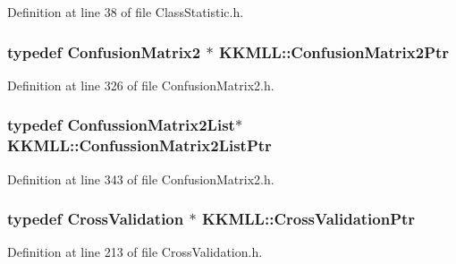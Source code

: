 Definition at line 38 of file Class\+Statistic.\+h.

\subsubsection[{\texorpdfstring{Confusion\+Matrix2\+Ptr}{ConfusionMatrix2Ptr}}]{\setlength{\rightskip}{0pt plus 5cm}typedef {\bf Confusion\+Matrix2} $\ast$ {\bf K\+K\+M\+L\+L\+::\+Confusion\+Matrix2\+Ptr}}\hypertarget{namespace_k_k_m_l_l_a724c9a3c5315800e128adf68253e91ae}{}\label{namespace_k_k_m_l_l_a724c9a3c5315800e128adf68253e91ae}


Definition at line 326 of file Confusion\+Matrix2.\+h.

\subsubsection[{\texorpdfstring{Confussion\+Matrix2\+List\+Ptr}{ConfussionMatrix2ListPtr}}]{\setlength{\rightskip}{0pt plus 5cm}typedef {\bf Confussion\+Matrix2\+List}$\ast$ {\bf K\+K\+M\+L\+L\+::\+Confussion\+Matrix2\+List\+Ptr}}\hypertarget{namespace_k_k_m_l_l_a003f81204ad8e351f5333ff873ae8796}{}\label{namespace_k_k_m_l_l_a003f81204ad8e351f5333ff873ae8796}


Definition at line 343 of file Confusion\+Matrix2.\+h.

\subsubsection[{\texorpdfstring{Cross\+Validation\+Ptr}{CrossValidationPtr}}]{\setlength{\rightskip}{0pt plus 5cm}typedef {\bf Cross\+Validation} $\ast$ {\bf K\+K\+M\+L\+L\+::\+Cross\+Validation\+Ptr}}\hypertarget{namespace_k_k_m_l_l_af409490d63bba2b6556dc135aa140c1b}{}\label{namespace_k_k_m_l_l_af409490d63bba2b6556dc135aa140c1b}


Definition at line 213 of file Cross\+Validation.\+h.

